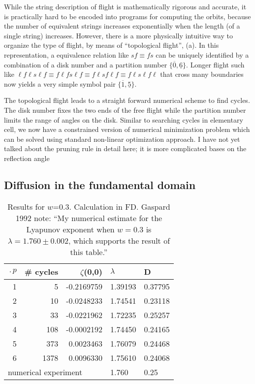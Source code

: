 \documentclass[aps,pre,
                showpacs,
                twocolumn,
                groupedaddress,
                floatfix]{revtex4-1}
\begin{document}
While the string description of flight is mathematically rigorous and
accurate, it is practically hard to be encoded into programs for
computing the orbits, because the number of equivalent strings increases
exponentially when the length (of a single string) increases. However,
there is a more physically intuitive way to organize the type of flight,
by means of ``topological flight'',  (a). In this
representation, a equivalence relation like $sf\equiv fs$ can be uniquely
identified by a combination of a disk number and a partition number
$\{\overline{0},\underline{6}\}$. Longer flight such like $\ell f \ell s
\ell f \equiv  f \ell f s \ell f \equiv f \ell s f \ell f \equiv f \ell s
\ell f \ell$ that cross many boundaries now yields a very simple symbol
pair $\{\overline{1},\underline{5}\}$.

The topological flight leads to a straight forward numerical scheme to
find cycles. The disk number fixes the two ends of the free flight while
the partition number limits the range of angles on the disk. Similar to
searching cycles in elementary cell, we now have a constrained version of
numerical minimization problem which can be solved using standard
non-linear optimization approach.
    {I have not yet talked about the pruning rule in detail here; it is
    more complicated bases on the reflection angle}

\subsection{Diffusion in the fundamental domain}
\begin{table}[htbp]
\hfill
{}
\begin{tabular}{|r|r|r|l|l|}
\hline
$\period{p}$ & \# cycles & $\zeta$(0,0) & $\lambda$ & D \\ \hline\hline
1      & 5      & -0.2169759 & 1.39193 & 0.37795 \\
2      & 10     & -0.0248233 & 1.74541 & 0.23118\\
3      & 33     & -0.0221962 & 1.72235 & 0.25257\\
4      & 108    & -0.0002192 & 1.74450 & 0.24165\\
5      & 373    &  0.0023463 & 1.76079 & 0.24468\\
6      & 1378   &  0.0096330 & 1.75610 & 0.24068\\ \hline\hline
\multicolumn{3}{|l|}{numerical experiment}
                           & 1.760 & 0.25
\\ \hline
\end{tabular}

\caption{\label{TCELL2}
  Results for $w$=0.3. Calculation in FD. Gaspard 1992
  note: ``My numerical estimate for the Lyapunov exponent when $w=0.3$ is
  $\lambda = 1.760 \pm 0.002$, which supports the result of this table.''
}
\end{table}
\end{document}
